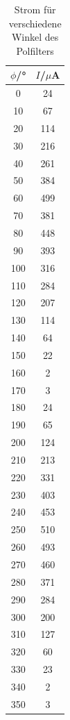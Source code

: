 \begin{table}[H]
	\begin{center}
		\begin{tabular}{c c}
			\toprule
			\(\phi\)/° & \(I\)/\(\mu\)A \\
			\midrule
			0       &24\\
			10      &67\\
			20      &114\\
			30      &216\\
			40      &261\\
			50      &384\\
			60      &499\\
			70      &381\\
			80      &448\\
			90      &393\\
			100     &316\\
			110     &284\\
			120     &207\\
			130     &114\\
			140     &64\\
			150     &22\\
			160     &2\\
			170     &3\\
			180     &24\\
			190     &65\\
			200     &124\\
			210     &213\\
			220     &331\\
			230     &403\\
			240     &453\\
			250     &510\\
			260     &493\\
			270     &460\\
			280     &371\\
			290     &284\\
			300     &200\\
			310     &127\\
			320     &60\\
			330     &23  \\                                                                                            
			340     &2      \\                                                                                         
			350     &3  	\\
			\bottomrule
		\end{tabular}
		\caption{Strom für verschiedene Winkel des Polfilters}
		\label{fig:t3}
	\end{center}
\end{table}

